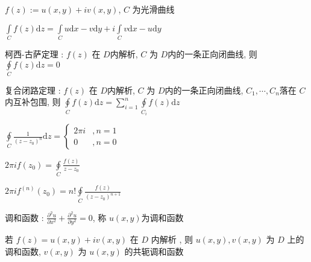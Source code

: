\documentclass[UTF8, 12pt]{ctexart}
\begin{document}
	$ f(z) := u(x, y) + iv(x, y) $, $ C $ 为光滑曲线

	$ \int\limits_{C}f(z)\mathrm{d}z = \int\limits_{C}u\mathrm{d}x-v\mathrm{d}y + i \int\limits_{C}v\mathrm{d}x-u\mathrm{d}y $

	柯西-古萨定理 : $ f(z) $ 在 $ D $内解析, $ C $ 为 $ D $内的一条正向闭曲线, 则 $ \oint\limits_{C}f(z)\mathrm{d}z = 0 $

	复合闭路定理 : $ f(z) $ 在 $ D $内解析, $ C $ 为 $ D $内的一条正向闭曲线, $ C_{1}, \cdots, C_{n} $落在 $ C $内互补包围, 则 $ \oint\limits_{C}f(z)\mathrm{d}z = \sum_{i=1}^{n}\oint\limits_{C_{i}}f(z)\mathrm{d}z $

	$ \oint\limits_{C}\frac{1}{(z-z_{0})^{n}}\mathrm{d}z = \begin{cases} 2\pi i&, n = 1 \\ 0&, n = 0 \end{cases} $

	$ 2\pi if(z_{0}) = \oint\limits_{C}\frac{f(z)}{z-z_{0}} $

	$ 2\pi if^{(n)}(z_{0}) = n!\oint\limits_{C}\frac{f(z)}{(z-z_{0})^{n+1}} $

	调和函数 : $ \frac{\partial^{2} u}{\partial x^{2}} + \frac{\partial^{2} u}{\partial y^{2}} = 0 $, 称 $ u(x, y) $为调和函数

	若 $ f(z) = u(x, y) + iv(x, y) $ 在 $ D $ 内解析 , 则 $ u(x, y), v(x, y) $ 为 $ D $ 上的调和函数, $ v(x, y) $ 为 $ u(x, y) $ 的共轭调和函数
	
\end{document}
